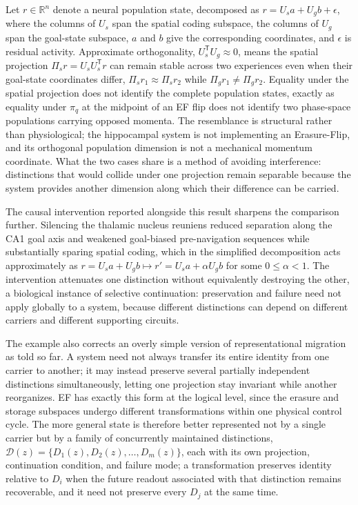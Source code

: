 \documentclass[11pt]{article}
\begin{document}
Let $r\in\mathbb R^n$ denote a neural population state, decomposed as $r = U_s a + U_g b + \epsilon$, where the columns of $U_s$ span the spatial coding subspace, the columns of $U_g$ span the goal-state subspace, $a$ and $b$ give the corresponding coordinates, and $\epsilon$ is residual activity. Approximate orthogonality, $U_s^{\mathsf T}U_g\approx0$, means the spatial projection $\Pi_s r = U_sU_s^{\mathsf T}r$ can remain stable across two experiences even when their goal-state coordinates differ, $\Pi_s r_1\approx\Pi_s r_2$ while $\Pi_g r_1\neq\Pi_g r_2$. Equality under the spatial projection does not identify the complete population states, exactly as equality under $\pi_q$ at the midpoint of an EF flip does not identify two phase-space populations carrying opposed momenta. The resemblance is structural rather than physiological; the hippocampal system is not implementing an Erasure-Flip, and its orthogonal population dimension is not a mechanical momentum coordinate. What the two cases share is a method of avoiding interference: distinctions that would collide under one projection remain separable because the system provides another dimension along which their difference can be carried.

The causal intervention reported alongside this result sharpens the comparison further. Silencing the thalamic nucleus reuniens reduced separation along the CA1 goal axis and weakened goal-biased pre-navigation sequences while substantially sparing spatial coding, which in the simplified decomposition acts approximately as $r = U_s a + U_g b \mapsto r' = U_s a + \alpha U_g b$ for some $0\le\alpha<1$. The intervention attenuates one distinction without equivalently destroying the other, a biological instance of selective continuation: preservation and failure need not apply globally to a system, because different distinctions can depend on different carriers and different supporting circuits.

The example also corrects an overly simple version of representational migration as told so far. A system need not always transfer its entire identity from one carrier to another; it may instead preserve several partially independent distinctions simultaneously, letting one projection stay invariant while another reorganizes. EF has exactly this form at the logical level, since the erasure and storage subspaces undergo different transformations within one physical control cycle. The more general state is therefore better represented not by a single carrier but by a family of concurrently maintained distinctions, $\mathcal D(z) = \{D_1(z),D_2(z),\ldots,D_m(z)\}$, each with its own projection, continuation condition, and failure mode; a transformation preserves identity relative to $D_i$ when the future readout associated with that distinction remains recoverable, and it need not preserve every $D_j$ at the same time.
\end{document}
